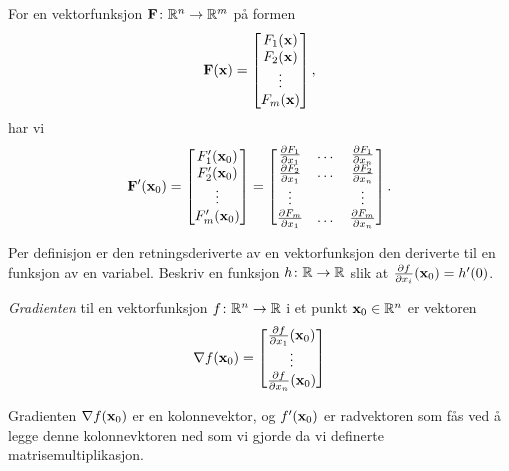 For en vektorfunksjon $\mathbf{F} \colon \mathbb{R}^n \to \mathbb{R}^m$ på formen
$$\mathbf{F}(\mathbf{x}) = \begin{bmatrix} F_1(\mathbf{x}) \\ F_2(\mathbf{x}) \\ \vdots \\ F_m(\mathbf{x}) \end{bmatrix},$$
har vi
$$\mathbf{F}'(\mathbf{x}_0) = \begin{bmatrix} F'_1(\mathbf{x}_0) \\ F'_2(\mathbf{x}_0) \\ \vdots \\ F'_m(\mathbf{x}_0) \end{bmatrix}
= 
\begin{bmatrix}
  \frac{\partial F_1}{\partial x_1}
  & \dots &
  \frac{\partial F_1}{\partial x_n}
  \\
  \frac{\partial F_2}{\partial x_1}
  & \dots &
  \frac{\partial F_2}{\partial x_n}
  \\
  \vdots &&  \vdots \\
  \frac{\partial F_m}{\partial x_1}
         & \dots&
  \frac{\partial F_m}{\partial x_n}
  \end{bmatrix}.$$
\begin{oppgave}
  Per definisjon er den retningsderiverte av en vektorfunksjon den deriverte til en funksjon av en variabel. 
  Beskriv en funksjon $h \colon \mathbb{R} \to \mathbb{R}$ slik at $\frac{\partial f}{\partial x_i}(\mathbf{x}_0) = h'(0)$.
\end{oppgave}
\begin{definisjon}
  {\em Gradienten} til en vektorfunksjon $f \colon \mathbb{R}^n \to \mathbb{R}$ i et punkt $\mathbf{x}_0 \in \mathbb{R}^n$ er vektoren
  $$\nabla f(\mathbf{x}_0) = \begin{bmatrix}\frac{\partial f}{\partial x_1}(\mathbf{x}_0) \\ \vdots \\ \frac{\partial f}{\partial x_n}(\mathbf{x}_0)\end{bmatrix} $$
\end{definisjon}
\begin{bemerkning}
  Gradienten $\nabla f(\mathbf{x}_0)$ er en kolonnevektor, og $f'(\mathbf{x}_0)$ er
  radvektoren som fås ved å legge denne kolonnevktoren ned som vi gjorde da vi
  definerte matrisemultiplikasjon.
\end{bemerkning}
